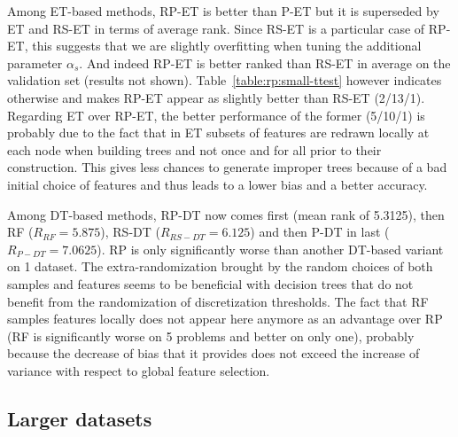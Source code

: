
Among ET-based methods, RP-ET is better than P-ET but it is superseded by ET and
RS-ET in terms of average rank. Since RS-ET is a particular case of RP-ET, this
suggests that we are slightly overfitting when tuning the additional parameter
$\alpha_s$. And indeed RP-ET is better ranked than RS-ET in average on the validation
set (results not shown). Table~\ref{table:rp:small-ttest} however indicates
otherwise and makes RP-ET appear as slightly better than RS-ET (2/13/1).
Regarding ET over RP-ET, the better performance of the former (5/10/1) is
probably due to the fact that in ET subsets of features are redrawn locally at
each node when building trees and not once and for all prior to their
construction. This gives less chances to generate improper trees because of a
bad initial choice of features and thus leads to a lower bias and a better
accuracy.


Among DT-based methods, RP-DT now comes first (mean rank of 5.3125),
then RF ($R_{RF} = 5.875$), RS-DT ($R_{RS-DT} = 6.125$) and then P-DT
in last ($R_{P-DT} = 7.0625$). RP is only significantly worse than
another DT-based variant on 1 dataset. The extra-randomization brought
by the random choices of both samples and features seems to be
beneficial with decision trees that do not benefit from the
randomization of discretization thresholds. The fact that RF samples
features locally does not appear here anymore as an advantage over RP
(RF is significantly worse on 5 problems and better on only one),
probably because the decrease of bias that it provides does not exceed
the increase of variance with respect to global feature selection.

\subsection{Larger datasets}

